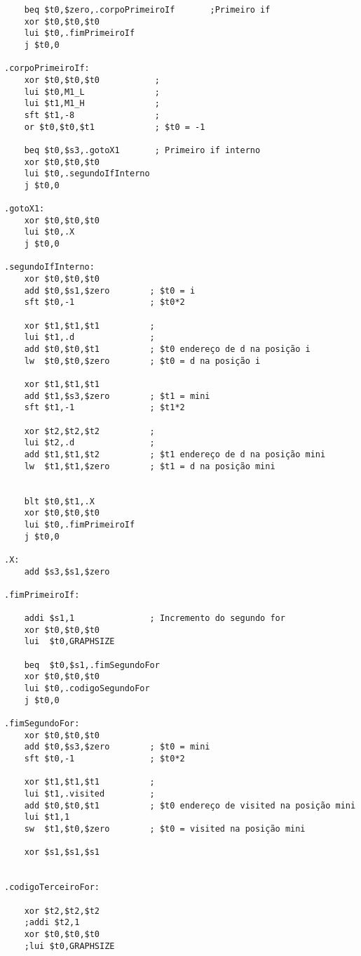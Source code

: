 \begin{verbatim}
    beq $t0,$zero,.corpoPrimeiroIf       ;Primeiro if  
    xor $t0,$t0,$t0      
    lui $t0,.fimPrimeiroIf
    j $t0,0

.corpoPrimeiroIf:        
    xor $t0,$t0,$t0           ;
    lui $t0,M1_L              ;
    lui $t1,M1_H              ;
    sft $t1,-8                ; 
    or $t0,$t0,$t1            ; $t0 = -1

    beq $t0,$s3,.gotoX1       ; Primeiro if interno
    xor $t0,$t0,$t0 
    lui $t0,.segundoIfInterno
    j $t0,0

.gotoX1:
    xor $t0,$t0,$t0
    lui $t0,.X
    j $t0,0

.segundoIfInterno:                   
    xor $t0,$t0,$t0
    add $t0,$s1,$zero        ; $t0 = i   
    sft $t0,-1               ; $t0*2  
    
    xor $t1,$t1,$t1          ;
    lui $t1,.d               ; 
    add $t0,$t0,$t1          ; $t0 endereço de d na posição i
    lw  $t0,$t0,$zero        ; $t0 = d na posição i

    xor $t1,$t1,$t1
    add $t1,$s3,$zero        ; $t1 = mini   
    sft $t1,-1               ; $t1*2  
    
    xor $t2,$t2,$t2          ;
    lui $t2,.d               ; 
    add $t1,$t1,$t2          ; $t1 endereço de d na posição mini
    lw  $t1,$t1,$zero        ; $t1 = d na posição mini

    
    blt $t0,$t1,.X
    xor $t0,$t0,$t0
    lui $t0,.fimPrimeiroIf
    j $t0,0 

.X:
    add $s3,$s1,$zero     

.fimPrimeiroIf:
    
    addi $s1,1               ; Incremento do segundo for
    xor $t0,$t0,$t0 
    lui  $t0,GRAPHSIZE
    
    beq  $t0,$s1,.fimSegundoFor  
    xor $t0,$t0,$t0     
    lui $t0,.codigoSegundoFor  
    j $t0,0

.fimSegundoFor:
    xor $t0,$t0,$t0 
    add $t0,$s3,$zero        ; $t0 = mini   
    sft $t0,-1               ; $t0*2  
    
    xor $t1,$t1,$t1          ;
    lui $t1,.visited         ; 
    add $t0,$t0,$t1          ; $t0 endereço de visited na posição mini
    lui $t1,1
    sw  $t1,$t0,$zero        ; $t0 = visited na posição mini
        
    xor $s1,$s1,$s1  
    

.codigoTerceiroFor:

    xor $t2,$t2,$t2   
    ;addi $t2,1     
    xor $t0,$t0,$t0
    ;lui $t0,GRAPHSIZE


\end{verbatim}
